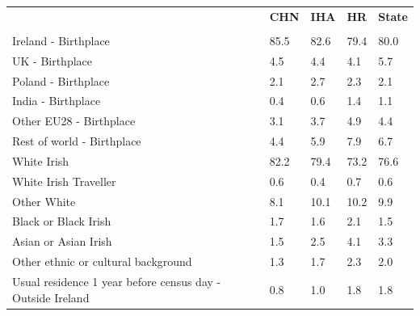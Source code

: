 \documentclass{article}
\begin{document}
\pagebreak
\begin{table}[h]	
\centering
		\begin{tabular}{KTTTT}
  \hline
& \textbf{CHN} & \textbf{IHA} & \textbf{HR}& \textbf{State}\\ 
  \hline
    \\ 
    \hline
Ireland - Birthplace & 85.5& 82.6& 79.4& 80.0\\
UK - Birthplace & 4.5& 4.4& 4.1& 5.7\\
Poland - Birthplace & 2.1& 2.7& 2.3& 2.1\\
India - Birthplace & 0.4& 0.6& 1.4& 1.1\\
Other EU28 - Birthplace & 3.1& 3.7& 4.9& 4.4\\
Rest of world - Birthplace & 4.4& 5.9& 7.9& 6.7\\
    \hline
White Irish & 82.2& 79.4& 73.2& 76.6\\
White Irish Traveller & 0.6& 0.4& 0.7& 0.6\\
Other White &  8.1& 10.1& 10.2&  9.9\\
Black or Black Irish & 1.7& 1.6& 2.1& 1.5\\
Asian or Asian Irish & 1.5& 2.5& 4.1& 3.3\\
Other ethnic or cultural background & 1.3& 1.7& 2.3& 2.0\\
    \hline
Usual residence 1 year before census day - Outside Ireland & 0.8& 1.0& 1.8& 1.8\\


\end{tabular}
\end{table}
\end{document}
